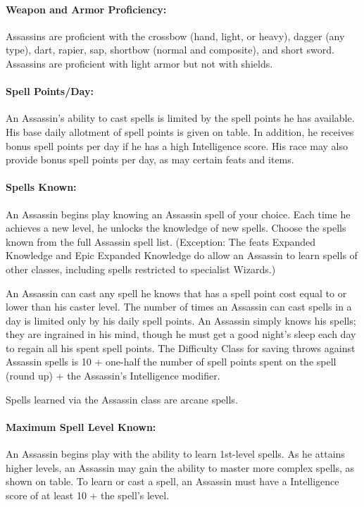 \paragraph{Weapon and Armor Proficiency:}
Assassins are proficient with the crossbow (hand, light, or heavy), dagger (any type), dart, rapier, sap, shortbow (normal and composite), and short sword. 
Assassins are proficient with light armor but not with shields.

\paragraph{Spell Points/Day:} 
An Assassin's ability to cast spells is limited by the spell points he has available. 
His base daily allotment of spell points is given on  table. 
In addition, he receives bonus spell points per day if he has a high Intelligence score.
His race may also provide bonus spell points per day, as may certain feats and items.

\paragraph{Spells Known:} An Assassin begins play knowing an Assassin spell of your choice. 
Each time he achieves a new level, he unlocks the knowledge of new spells.
Choose the spells known from the full Assassin spell list.
(Exception: The feats Expanded Knowledge and Epic Expanded Knowledge 
do allow an Assassin to learn spells of other classes, 
including spells restricted to specialist Wizards.) 

An Assassin can cast any spell he knows that has a spell point cost equal to or lower than his caster level.
The number of times an Assassin can cast spells in a day is limited only by his daily spell points. 
An Assassin simply knows his spells; they are ingrained in his mind, 
though he must get a good night's sleep each day to regain all his spent spell points.
The Difficulty Class for saving throws against Assassin spells is 
10 + one-half the number of spell points spent on the spell (round up) + the Assassin's Intelligence modifier. 

Spells learned via the Assassin class are arcane spells.
\paragraph{Maximum Spell Level Known:} An Assassin begins play with the ability to learn 1st-level spells. 
As he attains higher levels, 
an Assassin may gain the ability to master more complex spells, as shown on  table.
To learn or cast a spell, an Assassin must have a Intelligence score of at least 10 + the spell's level.

